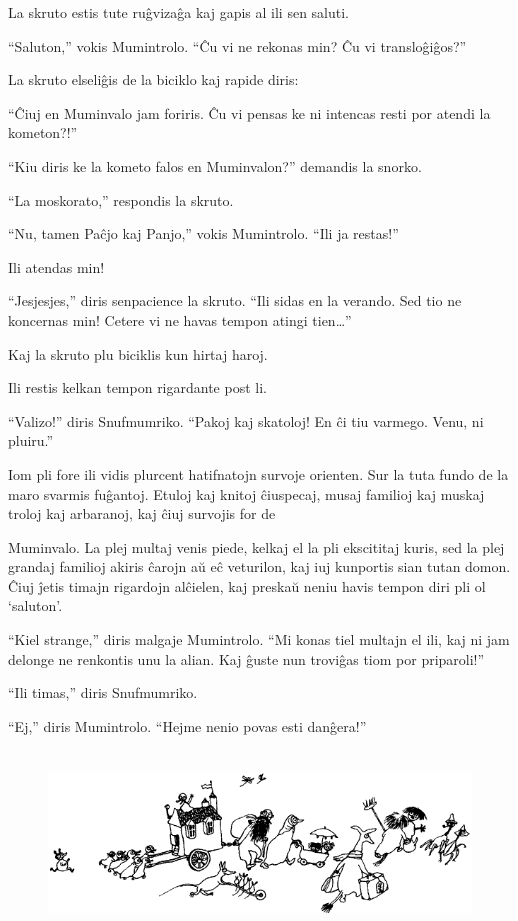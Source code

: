 La skruto estis tute ruĝvizaĝa kaj gapis al ili sen saluti.

``Saluton,'' vokis Mumintrolo. ``Ĉu vi ne rekonas min? Ĉu vi transloĝiĝos?''

La skruto elseliĝis de la biciklo kaj rapide diris:

``Ĉiuj en Muminvalo jam foriris. Ĉu vi pensas ke ni intencas resti por atendi la kometon?!''

``Kiu diris ke la kometo falos en Muminvalon?'' demandis la snorko.

``La moskorato,'' respondis la skruto.

``Nu, tamen Paĉjo kaj Panjo,'' vokis Mumintrolo. ``Ili ja restas!''

Ili atendas min!

``Jesjesjes,'' diris senpacience la skruto. ``Ili sidas en la verando. Sed tio ne koncernas min! Cetere vi ne havas tempon atingi tien{\ldots}''

Kaj la skruto plu biciklis kun hirtaj haroj.

Ili restis kelkan tempon rigardante post li.

``Valizo!'' diris Snufmumriko. ``Pakoj kaj skatoloj! En ĉi tiu varmego. Venu, ni pluiru.''

Iom pli fore ili vidis plurcent hatifnatojn survoje orienten. Sur la tuta fundo de la maro svarmis fuĝantoj. Etuloj kaj knitoj ĉiuspecaj, musaj familioj kaj muskaj troloj kaj arbaranoj, kaj ĉiuj survojis for de

Muminvalo. La plej multaj venis piede, kelkaj el la pli ekscititaj kuris, sed la plej grandaj familioj akiris ĉarojn aŭ eĉ veturilon, kaj iuj kunportis sian tutan domon. Ĉiuj ĵetis timajn rigardojn alĉielen, kaj preskaŭ neniu havis tempon diri pli ol `saluton'.

``Kiel strange,'' diris malgaje Mumintrolo. ``Mi konas tiel multajn el ili, kaj ni jam delonge ne renkontis unu la alian. Kaj ĝuste nun troviĝas tiom por priparoli!''

``Ili timas,'' diris Snufmumriko.

``Ej,'' diris Mumintrolo. ``Hejme nenio povas esti danĝera!''

\begin{figure}[htbp]
\centering
\includegraphics[width=417pt,height=138pt]{8-2.png}
\caption{}
\label{8-2}
\end{figure}

